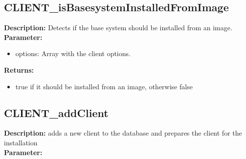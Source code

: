 \subsection{CLIENT\_isBasesystemInstalledFromImage}
\textbf{Description:} Detects if the base system should be installed from an image.\\
\textbf{Parameter:}
\begin{itemize}
\item options: Array with the client options.
\end{itemize}
\textbf{Returns:}
\begin{itemize}
\item true if it should be installed from an image, otherwise false
\end{itemize}

\subsection{CLIENT\_addClient}
\textbf{Description:} adds a new client to the database and prepares the client for the installation\\
\textbf{Parameter:}
